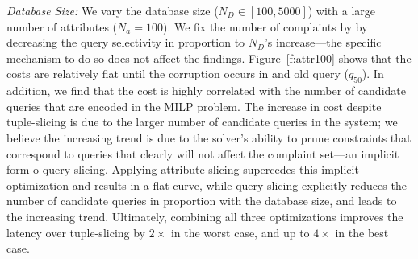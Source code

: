 \emph{Database Size:} 
We vary the database size ($N_D \in [100,5000]$) with a large number of attributes ($N_a = 100$).
We fix the number of complaints by by decreasing the query selectivity in proportion to $N_D$'s increase---the specific mechanism to do so does not affect the findings.
Figure~\ref{f:attr100} shows that the costs are relatively flat until the corruption occurs in and old query ($q_{50}$).  
In addition, we find that the cost is highly correlated with the number of candidate queries that are encoded in the MILP problem.
The increase in cost despite tuple-slicing is due to the larger number of candidate queries in the system; 
we believe the increasing trend is due to the solver's ability to prune constraints that correspond to queries that clearly will not affect the complaint set---an implicit form o query slicing.  
Applying attribute-slicing supercedes this implicit optimization and results in a flat curve, 
while query-slicing explicitly reduces the number of candidate queries in proportion with the database size, and leads to the increasing trend.
Ultimately, combining all three optimizations improves the latency over tuple-slicing by $2\times$ in the worst case, and up to $4\times$ in the best case.


